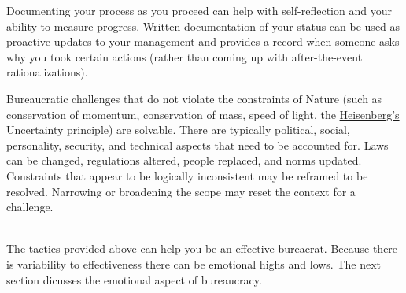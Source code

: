 Documenting your process as you proceed can help with self-reflection and your ability to measure progress. Written documentation of your status can be used as proactive updates to your management and provides a record when someone asks  why you took certain actions (rather than coming up with after-the-event rationalizations).

Bureaucratic challenges that do not violate the constraints of Nature (such as conservation of momentum, conservation of mass, speed of light, the \href{https://en.wikipedia.org/wiki/Uncertainty_principle}{Heisenberg's Uncertainty principle}) 
are solvable. There are typically political, social, personality, security, and technical aspects that need to be accounted for. Laws can be changed, regulations altered, people replaced, and norms updated. Constraints that appear to be logically inconsistent may be reframed to be resolved. Narrowing or broadening the scope may reset the context for a challenge.

\ \\


The tactics provided above can help you be an effective bureacrat. Because there is variability to effectiveness there can be emotional highs and lows. The next section dicusses the emotional aspect of bureaucracy.
